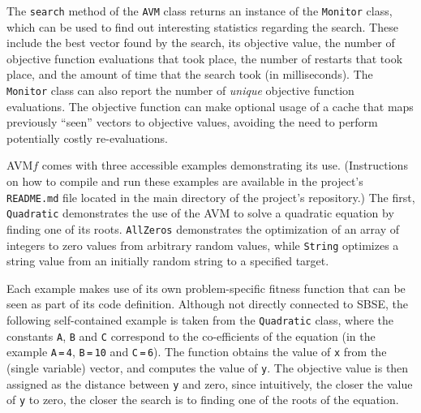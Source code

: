 \documentclass{llncs}
\newcommand{\AVM}{Alternating Variable Method\xspace}
\newcommand{\name}{AVM\hspace{-1pt}$f$\xspace}
\newcommand{\inlineheading}[1]{\vspace{1mm} \noindent {\bf #1.}}
\begin{document}
\begin{sloppypar}
\inlineheading{Reporting} The {\tt search} method of the {\tt AVM} class returns an instance of the {\tt Monitor} class, which can be used to find out interesting statistics regarding the search. These include the best vector found by the search, its objective value, the number of objective function evaluations that took place, the number of restarts that took place, and the amount of time that the search took (in milliseconds). The {\tt Monitor} class can also report the number of {\it unique} objective function evaluations. The objective function can make optional usage of a cache that maps previously ``seen'' vectors to objective values, avoiding the need to perform potentially costly re-evaluations.
\end{sloppypar}

\inlineheading{Examples} \name comes with three accessible examples demonstrating its use. (Instructions on how to compile and run these examples are available in the project's {\tt README.md} file located in the main directory of the project's repository.) The first, {\tt Quadratic} demonstrates the use of the AVM to solve a quadratic equation by finding one of its roots. {\tt AllZeros} demonstrates the optimization of an array of integers to zero values from arbitrary random values, while {\tt String} optimizes a string value from an initially random string to a specified target.

Each example makes use of its own problem-specific fitness function that can be seen as part of its code definition.  Although not directly connected to SBSE, the following self-contained example is taken from the {\tt Quadratic} class, where the constants {\tt A}, {\tt B} and {\tt C} correspond to the co-efficients of the equation (in the example {\tt A}\,{\tt =}\,{\tt 4}, {\tt B}\,{\tt =}\,{\tt 10} and {\tt C}\,{\tt =}\,{\tt 6}). The function obtains the value of {\tt x} from the (single variable) vector, and computes the value of {\tt y}. The objective value is then assigned as the distance between {\tt y} and zero, since intuitively, the closer the value of {\tt y} to zero, the closer the search is to finding one of the roots of the equation.
\end{document}
